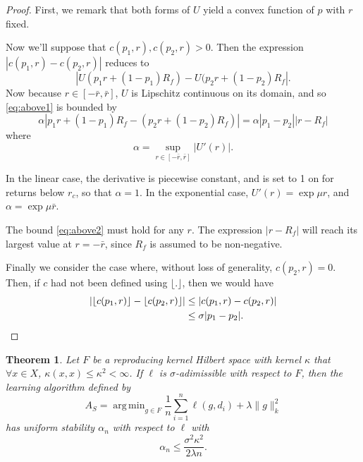 \documentclass[11pt]{article}
\DeclareMathOperator*{\argmin}{arg\,min}
\DeclarePairedDelimiter\floor{\lfloor}{\rfloor}
\theoremstyle{plain}
\newtheorem{thm}{Theorem}
\theoremstyle{definition}
\begin{document}
\begin{proof}
  First, we remark that both forms of $U$ yield a convex function of $p$ with $r$ fixed. 

  Now we'll suppose that $c(p_1,r), c(p_2,r) > 0$. Then the expression
  $|c(p_1,r)-c(p_2,r)|$ reduces to
  \begin{equation}
    \label{eq:above1}
    |U(p_1r + (1-p_1)R_f) - U(p_2r + (1-p_2)R_f|.
  \end{equation}
  Now because $r\in[-\bar r,\bar r]$, $U$ is Lipschitz continuous on its domain, and so
  \eqref{eq:above1} is bounded by
  \begin{equation}
    \label{eq:above2}
    \alpha |p_1r + (1-p_1)R_f - (p_2r + (1-p_2)R_f)| = \alpha|p_1-p_2||r-R_f|
  \end{equation}
  where
  \begin{equation}
    \alpha = \sup_{r\in[-\bar r,\bar r]} |U'(r)|.
  \end{equation}

  In the linear case, the derivative is piecewise constant, and is set to 1 on for returns
  below $r_c$, so that $\alpha=1$. In the exponential case, $U'(r) = \exp\mu r$, and
  $\alpha = \exp \mu \bar r$.

  The bound \eqref{eq:above2} must hold for any $r$. The expression $|r-R_f|$ will reach
  its largest value at $r=-\bar r$, since $R_f$ is assumed to be non-negative.

  Finally we consider the case where, without loss of generality, $c(p_2,r)=0$. Then, if
  $c$ had not been defined using $\lfloor .\rfloor$, then we would have
  \begin{align}
    |\floor*{c(p_1,r)} - \floor*{c(p_2,r)}| &\leq |c(p_1,r) - c(p_2,r)|\\
    &\leq \sigma|p_1-p_2|.\qedhere
  \end{align}
\end{proof}

\begin{thm}
  Let $F$ be a reproducing kernel Hilbert space with kernel $\kappa$ that
  $\forall x\in X$, $\kappa(x,x) \leq \kappa^2 <\infty$. If $\ell$ is $\sigma$-adimissible
  with respect to $F$, then the learning algorithm defined by
  \begin{equation}
    \label{eq:above3}
    A_S = \argmin_{g\in F}\frac{1}{n}\sum_{i=1}^n \ell(g,d_i) + \lambda\|g\|^2_k
  \end{equation}
  has uniform stability $\alpha_n$ with respect to $\ell$ with
  \begin{equation}
    \alpha_n \leq \frac{\sigma^2 \kappa^2}{2\lambda n}.
  \end{equation}
\end{thm}
\end{document}
